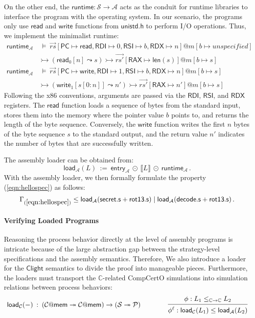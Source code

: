 \documentclass[acmsmall,screen,review,nonacm]{acmart}
\newcommand{\kw}[1]{\ensuremath{ \mathsf{#1} }}
\begin{document}
On the other end,
the $\kw{runtime} : \mathcal{S} \rightarrow \mathcal{A}$
acts as the conduit for runtime libraries
to interface the program with the operating system.
In our scenario,
the programs only use $\kw{read}$ and $\kw{write}$
functions from $\kw{unistd.h}$
to perform I/O operations.
Thus, we implement the minimalist runtime:
{\footnotesize
\begin{align*}
  \kw{runtime}_\mathcal{A} & \:\vDash\:
  \vec{rs}[\kw{PC} \mapsto \kw{read},
    \kw{RDI} \mapsto 0,
    \kw{RSI} \mapsto b,
    \kw{RDX} \mapsto n]@m[b \mapsto unspecified] \\
  & \rightarrowtail (\kw{read}_0[n] \leadsto s)
    \rightarrowtail \vec{rs'}[\kw{RAX} \mapsto \kw{len}(s)]@m[b \mapsto s] \\
  \kw{runtime}_\mathcal{A} & \:\vDash\:
    \vec{rs}[\kw{PC} \mapsto \kw{write},
    \kw{RDI} \mapsto 1,
    \kw{RSI} \mapsto b,
    \kw{RDX} \mapsto n]@m[b \mapsto s] \\ 
 &  \rightarrowtail
  (\kw{write}_1[s[0:n]] \leadsto n')
  \rightarrowtail \vec{rs'}[\kw{RAX} \mapsto n']@m[b \mapsto s]
\end{align*}
}
Following the x86 conventions,
arguments are passed via
the \kw{RDI}, \kw{RSI}, and \kw{RDX} registers.
The \kw{read} function
loads a sequence of bytes
from the standard input,
stores them into the memory
where the pointer value $b$ points to,
and returns the length of the byte sequence.
Conversely, the \kw{write} function
writes the first $n$ bytes
of the byte sequence $s$
to the standard output,
and the return value $n'$ indicates
the number of bytes that are successfully written.

The assembly loader can be obtained from:
\[
  \kw{load}_\mathcal{A}(L)
  \::=\: \kw{entry}_\mathcal{A} \: \odot \: \llbracket L \rrbracket
  \: \odot \: \kw{runtime}_\mathcal{A}
  \,.
\]
With the assembly loader,
we then formally formulate the property (\ref{eqn:hellospec})
as follows:
\[
\Gamma_\kw{(\ref{eqn:hellospec})} \le \kw{load}_\mathcal{A}(\kw{secret.s} + \kw{rot13.s})
\mid \kw{load}_\mathcal{A}(\kw{decode.s} + \kw{rot13.s})
\,.
\]

\paragraph{Verifying Loaded Programs}

Reasoning the process behavior
directly at the level of assembly programs
is intricate because of
the large abstraction gap between
the strategy-level specifications
and the assembly semantics.
Therefore,
We also introduce a loader
for the $\kw{Clight}$ semantics
to divide the proof
into manageable pieces.
Furthermore, the loaders
must transport
the $\mathbb{C}$-related CompCertO simulations
into
simulation relations
between process behaviors:
\[
  \kw{load}_\mathcal{C}(-)
  \: : \:
  (\mathcal{C}@\kw{mem} \twoheadrightarrow \mathcal{C}@\kw{mem}) \rightarrow (\mathcal{S} \twoheadrightarrow \mathcal{P})
  \qquad \qquad
  \begin{prooftree}
    \hypo{\phi: L_1 \le_{\mathbb{C} \rightarrow \mathbb{C}} L_2}
    \infer1{\phi^\ell: \kw{load}_\mathcal{C}(L_1) \le
      \kw{load}_\mathcal{A}(L_2)}
  \end{prooftree}
\]%
\end{document}
